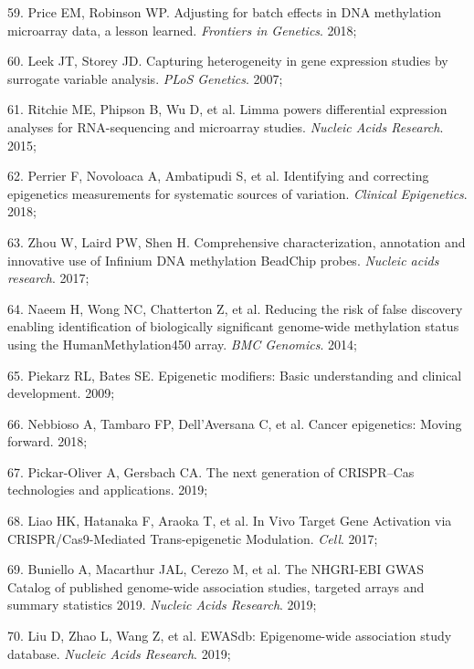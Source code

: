 \documentclass[11pt,twoside]{bristolthesis}
\newenvironment{cslreferences}%
  {}%
  {\par}
\begin{document}
\begin{cslreferences}
\leavevmode\hypertarget{ref-Price2018}{}%
59. Price EM, Robinson WP. Adjusting for batch effects in DNA methylation microarray data, a lesson learned. \emph{Frontiers in Genetics}. 2018;

\leavevmode\hypertarget{ref-Leek2007}{}%
60. Leek JT, Storey JD. Capturing heterogeneity in gene expression studies by surrogate variable analysis. \emph{PLoS Genetics}. 2007;

\leavevmode\hypertarget{ref-Ritchie2015}{}%
61. Ritchie ME, Phipson B, Wu D, et al. Limma powers differential expression analyses for RNA-sequencing and microarray studies. \emph{Nucleic Acids Research}. 2015;

\leavevmode\hypertarget{ref-Perrier2018}{}%
62. Perrier F, Novoloaca A, Ambatipudi S, et al. Identifying and correcting epigenetics measurements for systematic sources of variation. \emph{Clinical Epigenetics}. 2018;

\leavevmode\hypertarget{ref-Zhou2017}{}%
63. Zhou W, Laird PW, Shen H. Comprehensive characterization, annotation and innovative use of Infinium DNA methylation BeadChip probes. \emph{Nucleic acids research}. 2017;

\leavevmode\hypertarget{ref-Naeem2014}{}%
64. Naeem H, Wong NC, Chatterton Z, et al. Reducing the risk of false discovery enabling identification of biologically significant genome-wide methylation status using the HumanMethylation450 array. \emph{BMC Genomics}. 2014;

\leavevmode\hypertarget{ref-Piekarz2009}{}%
65. Piekarz RL, Bates SE. Epigenetic modifiers: Basic understanding and clinical development. 2009;

\leavevmode\hypertarget{ref-Nebbioso2018}{}%
66. Nebbioso A, Tambaro FP, Dell'Aversana C, et al. Cancer epigenetics: Moving forward. 2018;

\leavevmode\hypertarget{ref-Pickar-Oliver2019}{}%
67. Pickar-Oliver A, Gersbach CA. The next generation of CRISPR--Cas technologies and applications. 2019;

\leavevmode\hypertarget{ref-Liao2017}{}%
68. Liao HK, Hatanaka F, Araoka T, et al. In Vivo Target Gene Activation via CRISPR/Cas9-Mediated Trans-epigenetic Modulation. \emph{Cell}. 2017;

\leavevmode\hypertarget{ref-Buniello2019}{}%
69. Buniello A, Macarthur JAL, Cerezo M, et al. The NHGRI-EBI GWAS Catalog of published genome-wide association studies, targeted arrays and summary statistics 2019. \emph{Nucleic Acids Research}. 2019;

\leavevmode\hypertarget{ref-Liu2019}{}%
70. Liu D, Zhao L, Wang Z, et al. EWASdb: Epigenome-wide association study database. \emph{Nucleic Acids Research}. 2019;


\end{cslreferences}
\end{document}
